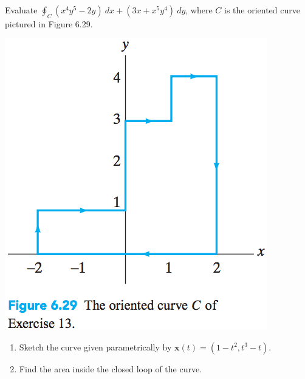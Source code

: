 \documentclass[12pt,letterpaper]{hmcpset}
\renewcommand{\bf}[1]{\mathbf{#1}}
\begin{document}

\begin{problem}[Colley 6.2.13]
    Evaluate $\oint_C(x^4y^5-2y)~dx+(3x+x^5y^4)~dy$, where $C$ is the
    oriented curve pictured in Figure 6.29.
    \begin{center}
        \includegraphics[scale=0.8]{img/6_2_13}
    \end{center}
\end{problem}
\begin{solution}
    \vfill
\end{solution}
\newpage

\begin{problem}[Colley 6.2.15]
    \begin{enumerate}
        \item Sketch the curve given parametrically by
            $\bf{x}(t)=(1-t^2,t^3-t)$.
        \item Find the area inside the closed loop of the curve.
    \end{enumerate}
\end{problem}
\begin{solution}
    \vfill
\end{solution}
\newpage
\end{document}
